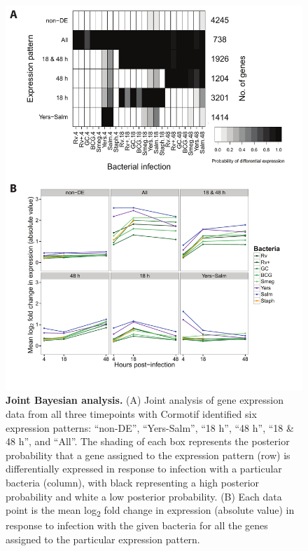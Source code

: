 \begin{figure}
\centering
\includegraphics[width=5in]{img/ch02/fig-02-joint-all.pdf}
\caption[Joint Bayesian analysis.]{\textbf{Joint Bayesian analysis.}
  (A) Joint analysis of gene expression data from all three timepoints
  with Cormotif \citep{Wei2015} identified six expression patterns:
  ``non-DE'', ``Yers-Salm'', ``18 h'', ``48 h'', ``18 \& 48 h'', and
  ``All''. The shading of each box represents the posterior
  probability that a gene assigned to the expression pattern (row) is
  differentially expressed in response to infection with a particular
  bacteria (column), with black representing a high posterior
  probability and white a low posterior probability. (B) Each data
  point is the mean log\textsubscript{2} fold change in expression
  (absolute value) in response to infection with the given bacteria
  for all the genes assigned to the particular expression pattern.}
\label{fig:joint-all}
\end{figure}

